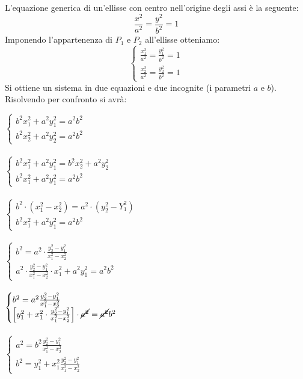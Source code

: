 \documentclass[12pt]{book}
\begin{document}
			L'equazione generica di un'ellisse con centro nell'origine degli assi è la seguente:
			\[\frac{x^2}{a^2}=\frac{y^2}{b^2}=1\]
			Imponendo l'appartenenza di $P_1$ e $P_2$ all'ellisse otteniamo:
			\[\begin{cases}
				\frac{x^2_1}{a^2}=\frac{y^2_1}{b^2}=1\\
				\frac{x^2_2}{a^2}=\frac{y^2_2}{b^2}=1
			\end{cases}\]
			Si ottiene un sistema in due equazioni e due incognite (i parametri $a$ e $b$).
			Risolvendo per confronto si avrà:
			\begin{multicols}{2}
			\noindent
			$\begin{cases}
				b^2x^2_1+a^2y^2_1=a^2b^2\\
				b^2x^2_2+a^2y^2_2=a^2b^2
			\end{cases}$\\\\
			$\begin{cases}
				b^2x^2_1+a^2y^2_1=b^2x^2_2+a^2y^2_2\\
				b^2x^2_1+a^2y^2_1=a^2b^2
			\end{cases}$\\\\
			$\begin{cases}
				b^2\cdot\left(x_1^2-x_2^2\right)=a^2\cdot\left(y_2^2-Y_1^2\right)\\
				b^2x_1^2+a^2y_1^2=a^2b^2
			\end{cases}$\\\\
			$\begin{cases}
				b^2=a^2\cdot\frac{y_2^2-y_1^2}{x_1^2-x_2^2}\\
				a^2\cdot\frac{y_2^2-y_1^2}{x_1^2-x_2^2}\cdot x_1^2+a^2y_1^2=a^2b^2
			\end{cases}$\\\\
			$\begin{cases}
				b^2=a^2\frac{y_2^2-y_1^2}{x_1^2-x_2^2}\\
				\left[y_1^2+x_1^2\cdot\frac{y_2^2-y_1^2}{x_1^2-x_2^2}\right]\cdot \cancel{a^2} = \cancel{a^2}b^2
			\end{cases}$\\\\
			$\begin{cases}
				a^2=b^2\frac{y_2^2-y_1^2}{x_1^2-x_2^2}\\
				b^2=y_1^2+x_1^2\frac{y_2^2-y_1^2}{x_1^2-x_2^2}
			\end{cases}$\\\\

\end{multicols}
\end{document}
